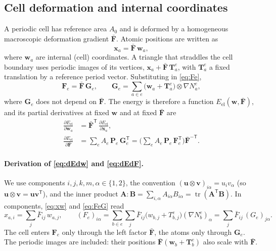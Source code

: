 \documentclass[11pt,a4paper]{article}
\newcommand{\Fb}{\bar{\mathbf F}}
\newcommand{\F}{\mathbf F}
\newcommand{\Pk}{\mathbf P}
\newcommand{\x}{\mathbf x}
\newcommand{\w}{\mathbf w}
\newcommand{\T}{\mathbf T}
\newcommand{\G}{\mathbf G}
\newcommand{\tr}{\operatorname{tr}}
\begin{document}
\subsection{Cell deformation and internal coordinates}

A periodic cell has reference area \(A_0\) and is deformed by a homogeneous macroscopic
deformation gradient \(\Fb\). Atomic positions are written as
\begin{equation}
  \x_a=\Fb\,\w_a ,
  \label{eq:xw}
\end{equation}
where \(\w_a\) are internal (cell) coordinates. A triangle that straddles the cell boundary uses
periodic images of its vertices, \(\x_a+\Fb\,\T_a^e\), with \(\T^e_a\) a fixed translation by a
reference period vector. Substituting in \eqref{eq:Fe},
\begin{equation}
  \F_e=\Fb\,\G_e,\qquad \G_e=\sum_{a\in e}\big(\w_a+\T^e_a\big)\otimes\nabla N^e_a ,
  \label{eq:FeG}
\end{equation}
where \(\G_e\) does not depend on \(\Fb\). The energy is therefore a function
\(E_{\mathrm{el}}(\w,\Fb)\), and its partial derivatives at fixed \(\w\) and at fixed \(\Fb\) are
\begin{align}
  \frac{\partial E_{\mathrm{el}}}{\partial\w_a}
    &=\Fb^{\mathsf T}\,\frac{\partial E_{\mathrm{el}}}{\partial\x_a},
  \label{eq:dEdw}\\
  \frac{\partial E_{\mathrm{el}}}{\partial\Fb}
    &=\sum_e A_e\,\Pk_e\,\G_e^{\mathsf T}
     =\Big(\sum_e A_e\,\Pk_e\,\F_e^{\mathsf T}\Big)\Fb^{-\mathsf T}.
  \label{eq:dEdF}
\end{align}

\paragraph{Derivation of \eqref{eq:dEdw} and \eqref{eq:dEdF}.}
We use components \(i,j,k,m,\alpha\in\{1,2\}\), the convention
\((\mathbf u\otimes\mathbf v)_{i\alpha}=u_iv_\alpha\) (so \(\mathbf u\otimes\mathbf v=\mathbf u\mathbf v^{\mathsf T}\)),
and the inner product \(\mathbf A:\mathbf B=\sum_{i,\alpha}A_{i\alpha}B_{i\alpha}=\tr(\mathbf A^{\mathsf T}\mathbf B)\).
In components, \eqref{eq:xw} and \eqref{eq:FeG} read
\begin{equation}
  x_{a,i}=\sum_j\bar F_{ij}\,w_{a,j},\qquad
  (F_e)_{i\alpha}=\sum_{b\in e}\sum_j\bar F_{ij}\big(w_{b,j}+T^e_{b,j}\big)(\nabla N^e_b)_\alpha
  =\sum_j\bar F_{ij}\,(G_e)_{j\alpha}.
  \label{eq:FeGcomp}
\end{equation}
The cell enters \(\F_e\) only through the left factor \(\Fb\), the atoms only through \(\G_e\). The
periodic images are included: their positions \(\Fb(\w_b+\T^e_b)\) also scale with \(\Fb\).
\end{document}
